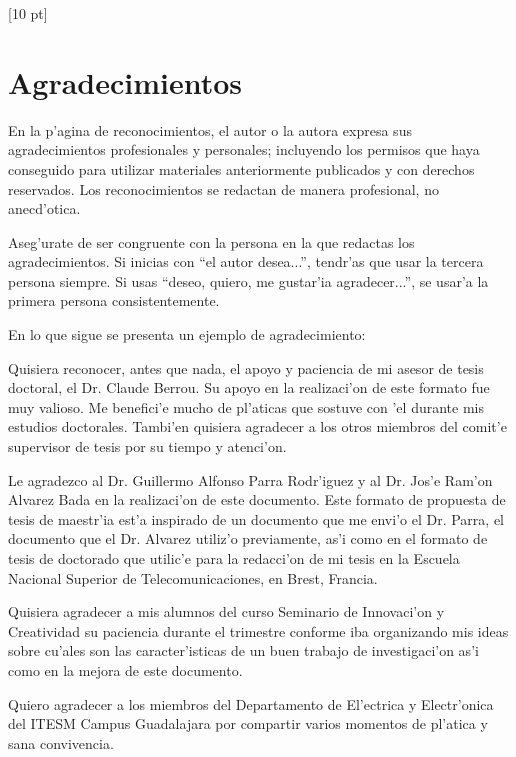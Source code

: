 \titleformat{\chapter}{\Huge\bfseries}{\thechapter}{0 pt}{\rule{340 pt}{3 pt}\\}
\titlespacing{\chapter}{100 pt}{-25 pt}{40 pt}[10 pt]	
\pagestyle{fancy}
\fancyhead[RO,RE]{\thepage}
\fancyfoot[CO,CE]{}

\chapter*{Agradecimientos}

\normalsize
\noindent En la p'agina de reconocimientos, el autor o la autora expresa sus agradecimientos profesionales y personales; incluyendo los permisos que haya conseguido para utilizar materiales anteriormente publicados y con derechos reservados. Los reconocimientos se redactan de manera profesional, no anecd'otica.

Aseg'urate de ser congruente con la persona en la que redactas los agradecimientos. Si inicias con ``el autor desea...'', tendr'as que usar la tercera persona siempre. Si usas ``deseo, quiero, me gustar'ia agradecer...'', se usar'a la primera persona consistentemente.

En lo que sigue se presenta un ejemplo de agradecimiento:

Quisiera reconocer, antes que nada, el apoyo y paciencia de mi asesor de tesis doctoral, el Dr. Claude Berrou. Su apoyo en la realizaci'on de este formato fue muy valioso. Me benefici'e mucho de pl'aticas que sostuve con 'el durante mis estudios doctorales. Tambi'en quisiera agradecer a los otros miembros del comit'e supervisor de tesis por su tiempo y atenci'on.

Le agradezco al Dr. Guillermo Alfonso Parra Rodr'iguez y al Dr. Jos'e Ram'on Alvarez Bada en la realizaci'on de este documento. Este formato de propuesta de tesis de maestr'ia est'a inspirado de un documento que me envi'o el Dr. Parra, el documento que el Dr. Alvarez utiliz'o previamente, as'i como en el formato de tesis de doctorado que utilic'e para la redacci'on de mi tesis en la Escuela Nacional Superior de Telecomunicaciones, en Brest, Francia.

Quisiera agradecer a mis alumnos del curso Seminario de Innovaci'on y Creatividad su paciencia durante el trimestre conforme iba organizando mis ideas sobre cu'ales son las caracter'isticas de un buen trabajo de investigaci'on as'i como en la mejora de este documento.

Quiero agradecer a los miembros del Departamento de El'ectrica y Electr'onica del ITESM Campus Guadalajara por compartir varios momentos de pl'atica y sana convivencia.
\clearpage
